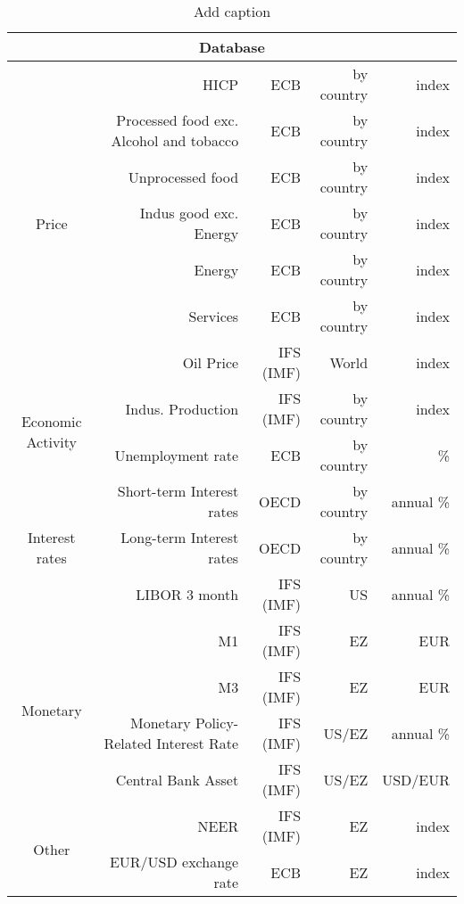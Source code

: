 \documentclass[11pt,a4paper]{letter}
\author{clément carrier}
\begin{document}
\begin{table}[htbp]
  \centering
  \caption{Add caption}
    \begin{tabular}{crrrr}
    \toprule
    \multicolumn{5}{c}{Database}
      \\
    \midrule
    \multirow{7}[14]{*}{Price} &
      HICP  &
      ECB &
      by country &
      index
      \\
     &
      Processed food exc. Alcohol and tobacco &
      ECB &
      by country &
      index
      \\
     &
      Unprocessed food &
      ECB &
      by country &
      index
      \\
     &
      Indus good exc. Energy &
      ECB &
      by country &
      index
      \\
     &
      Energy &
      ECB &
      by country &
      index
      \\
     &
      Services &
      ECB &
      by country &
      index
      \\
     &
      Oil Price &
      IFS (IMF) &
      World &
      index
      \\
    \multirow{2}[4]{*}{Economic Activity} &
      Indus. Production &
      IFS (IMF) &
      by country &
      index
      \\
     &
      Unemployment rate &
      ECB &
      by country &
      \%
      \\
    \multirow{3}[6]{*}{Interest rates} &
      Short-term Interest rates &
      OECD &
      by country &
      annual \%
      \\
     &
      Long-term Interest rates &
      OECD &
      by country &
      annual \%
      \\
     &
      LIBOR 3 month &
      IFS (IMF) &
      US &
      annual \%
      \\
    \multirow{4}[8]{*}{Monetary} &
      M1 &
      IFS (IMF) &
      EZ &
      EUR
      \\
     &
      M3 &
      IFS (IMF) &
      EZ &
      EUR
      \\
     &
      Monetary Policy-Related Interest Rate &
      IFS (IMF) &
      US/EZ &
      annual \%
      \\
     &
      Central Bank Asset &
      IFS (IMF) &
      US/EZ &
      USD/EUR
      \\
    \multirow{2}[4]{*}{Other} &
      NEER &
      IFS (IMF) &
      EZ &
      index
      \\
     &
      EUR/USD exchange rate &
      ECB &
      EZ &
      index
      \\
    \bottomrule
    \end{tabular}%
  \label{tab:addlabel}%
\end{table}
\end{document}
